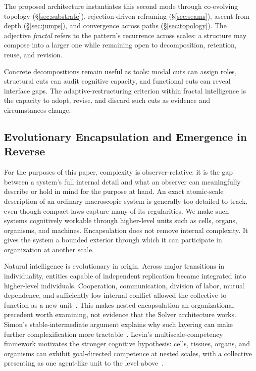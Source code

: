 \documentclass[11pt]{article}
\begin{document}
The proposed architecture instantiates this second mode through co-evolving topology (\S\ref{sec:substrate}), rejection-driven reframing (\S\ref{sec:seams}), ascent from depth (\S\ref{sec:jumps}), and convergence across paths (\S\ref{sec:topology}). The adjective \emph{fractal} refers to the pattern's recurrence across scales: a structure may compose into a larger one while remaining open to decomposition, retention, reuse, and revision.

Concrete decompositions remain useful as tools: modal cuts can assign roles, structural cuts can audit cognitive capacity, and functional cuts can reveal interface gaps. The adaptive-restructuring criterion within fractal intelligence is the capacity to adopt, revise, and discard such cuts as evidence and circumstances change.

\subsection{Evolutionary Encapsulation and Emergence in Reverse}
\label{sec:emergence}

For the purposes of this paper, complexity is observer-relative: it is the gap between a system's full internal detail and what an observer can meaningfully describe or hold in mind for the purpose at hand. An exact atomic-scale description of an ordinary macroscopic system is generally too detailed to track, even though compact laws capture many of its regularities. We make such systems cognitively workable through higher-level units such as cells, organs, organisms, and machines. Encapsulation does not remove internal complexity. It gives the system a bounded exterior through which it can participate in organization at another scale.

Natural intelligence is evolutionary in origin. Across major transitions in individuality, entities capable of independent replication became integrated into higher-level individuals. Cooperation, communication, division of labor, mutual dependence, and sufficiently low internal conflict allowed the collective to function as a new unit~\cite{west2015transitions,michod2007individuality}. This makes nested encapsulation an organizational precedent worth examining, not evidence that the Solver architecture works. Simon's stable-intermediate argument explains why such layering can make further complexification more tractable~\cite{simon1962}. Levin's multiscale-competency framework motivates the stronger cognitive hypothesis: cells, tissues, organs, and organisms can exhibit goal-directed competence at nested scales, with a collective presenting as one agent-like unit to the level above~\cite{levin2022tame}.
\end{document}
